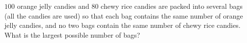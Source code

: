 $100$ orange jelly candies and $80$ chewy rice candies are packed into several bags (all the candies are used) so that each bag contains the same number of orange jelly candies, and no two bags contain the same number of chewy rice candies. What is the largest possible number of bags?
